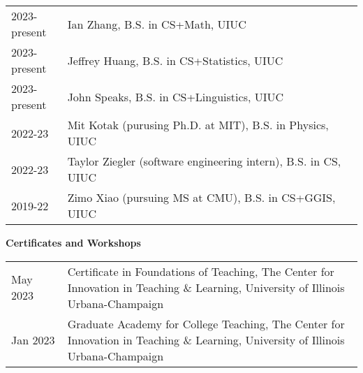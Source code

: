 \documentclass{acmcv}
\begin{document}
    \begin{longtable}{p{0.16\linewidth} p{0.84\linewidth}}
        2023-present & Ian Zhang, B.S. in CS+Math, UIUC \\
        2023-present & Jeffrey Huang, B.S. in CS+Statistics, UIUC \\
        2023-present & John Speaks, B.S. in CS+Linguistics, UIUC\\
        2022-23 & Mit Kotak (purusing Ph.D. at MIT), B.S. in Physics, UIUC\\
        2022-23 & Taylor Ziegler (software engineering intern), B.S. in CS, UIUC\\
        2019-22 & Zimo Xiao (pursuing MS at CMU), B.S. in CS+GGIS, UIUC\\
    \end{longtable}



    \textbf{Certificates and Workshops}
    \vspace*{-0.25cm}

    \begin{longtable}{p{0.16\linewidth} p{0.84\linewidth}}
        May 2023 & Certificate in Foundations of Teaching, The Center for Innovation in Teaching \& Learning, University of Illinois Urbana-Champaign \\

        Jan 2023 & Graduate Academy for College Teaching, The Center for Innovation in Teaching \& Learning, University of Illinois Urbana-Champaign \\

    \end{longtable}

    


\end{document}
